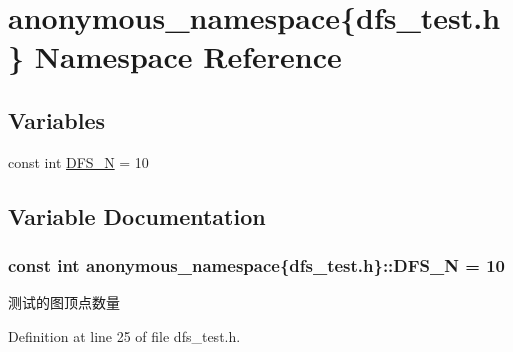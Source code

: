 \hypertarget{namespaceanonymous__namespace_02dfs__test_8h_03}{}\section{anonymous\+\_\+namespace\{dfs\+\_\+test.\+h\} Namespace Reference}
\label{namespaceanonymous__namespace_02dfs__test_8h_03}
\subsection*{Variables}
\begin{DoxyCompactItemize}
\item 
const int \hyperlink{namespaceanonymous__namespace_02dfs__test_8h_03_a37ec41bc82ae94b1f3736e26c9754ffb}{D\+F\+S\+\_\+\+N} = 10
\end{DoxyCompactItemize}


\subsection{Variable Documentation}
\hypertarget{namespaceanonymous__namespace_02dfs__test_8h_03_a37ec41bc82ae94b1f3736e26c9754ffb}{}
\subsubsection[{D\+F\+S\+\_\+\+N}]{\setlength{\rightskip}{0pt plus 5cm}const int anonymous\+\_\+namespace\{dfs\+\_\+test.\+h\}\+::D\+F\+S\+\_\+\+N = 10}\label{namespaceanonymous__namespace_02dfs__test_8h_03_a37ec41bc82ae94b1f3736e26c9754ffb}
测试的图顶点数量 

Definition at line 25 of file dfs\+\_\+test.\+h.

